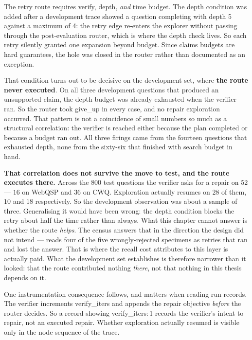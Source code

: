 The retry route requires verify, depth, \emph{and} time budget. The depth
condition was added after a development trace showed a question completing with
depth 5 against a maximum of 4: the retry edge re-enters the explorer without
passing through the post-evaluation router, which is where the depth check
lives. So each retry silently granted one expansion beyond budget. Since
 claims budgets are hard guarantees, the hole was closed in
the router rather than documented as an exception.

That condition turns out to be decisive on the development set, where
\textbf{the route never executed}. On all three development questions that
produced an unsupported claim, the depth budget was already exhausted when the
verifier ran. So the router took \textsf{give\_up} in every case, and no repair
exploration occurred. That pattern is not a coincidence of small numbers so
much as a structural correlation: the verifier is reached either because the
plan completed or because a budget ran out. All three firings came from
the fourteen questions that exhausted depth, none from the sixty-six that
finished with search budget in hand.

\textbf{That correlation does not survive the move to test, and the route
executes there.} Across the $800$ test questions the verifier asks for a
repair on $52$ --- $16$ on WebQSP and $36$ on CWQ. Exploration actually
resumes on $28$ of them, $10$ and $18$ respectively. So the development
observation was about a sample of three. Generalising it would have been
wrong: the depth condition blocks the retry about half the time rather than
always. What this chapter cannot answer is whether the route \emph{helps}.
The census answers that in the direction the design did not intend ---
 reads four of the five wrongly-rejected specimens
as retries that ran and lost the answer. That is where the recall cost
 attributes to this layer is actually paid.
What the development set establishes is therefore narrower than it looked:
that the route contributed nothing \emph{there}, not that nothing in this
thesis depends on it.

One instrumentation consequence follows, and matters when reading run records.
The verifier increments \textsf{verify\_iters} and appends the repair objective
\emph{before} the router decides. So a record showing \textsf{verify\_iters:\,1}
records the verifier's intent to repair, not an executed repair. Whether
exploration actually resumed is visible only in the node sequence of the trace.


